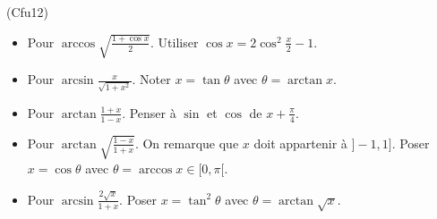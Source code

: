 \begin{tiny}(Cfu12)\end{tiny}
\begin{itemize}
 \item Pour $\arccos \sqrt{\frac{1+\cos x}{2}}$. Utiliser $\cos x =2\cos^2\frac{x}{2}-1$.

 \item Pour $\arcsin \frac{x}{\sqrt{1+x^{2}}}$. Noter $x=\tan \theta$ avec $\theta = \arctan x$.

 \item Pour $\arctan \frac{1+x}{1-x}$. Penser à $\sin$ et $\cos$ de $x+\frac{\pi}{4}$.

 \item Pour $\arctan \sqrt{\frac{1-x}{1+x}}$. On remarque que $x$ doit appartenir à $]-1,1]$. Poser $x=\cos \theta$ avec $\theta = \arccos x\in [0,\pi[$.

 \item Pour $\arcsin \frac{2\sqrt{x}}{1+x}$. Poser $x = \tan^2 \theta$ avec $\theta = \arctan \sqrt{x}$.
\end{itemize}
